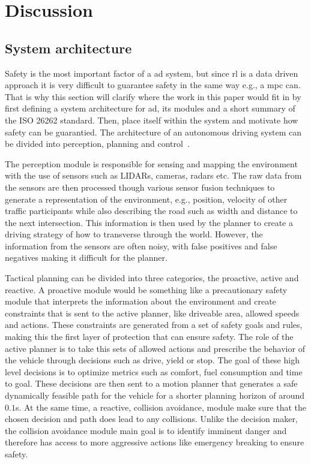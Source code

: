 \chapter{Discussion}
\label{sec:discussion}


\section{System architecture}
\label{sec:system_architecture}
Safety is the most important factor of a \gls{ad} system, but since \gls{rl} is a data driven approach it is very difficult to guarantee safety \cite{tbd} in the same way e.g., a \gls{mpc} can. That is why this section will clarify where the work in this paper would fit in by first defining a system architecture for \gls{ad}, its modules and a short summary of the ISO 26262 standard. Then, place itself within the system and motivate how safety can be guarantied. 
The architecture of an autonomous driving system can be divided into perception, planning and control~\cite{Schwarting2018,Kortenkamp2008}.

The perception module is responsible for sensing and mapping the environment with the use of sensors such as LIDARs, cameras, radars etc. The raw data from the sensors are then processed though various sensor fusion techniques to generate a representation of the environment, e.g., position, velocity of other traffic participants while also describing the road such as width and distance to the next intersection. This information is then used by the planner to create a driving strategy of how to transverse through the world. However, the information from the sensors are often noisy, with false positives and false negatives making it difficult for the planner.

Tactical planning can be divided into three categories, the proactive, active and reactive. A proactive module would be something like a precautionary safety module that interprets the information about the environment and create constraints that is sent to the active planner, like  driveable area, allowed speeds and actions. These constraints are generated from a set of safety goals and rules, making this the first layer of protection that can ensure safety. 
The role of the active planner is to take this sets of allowed actions and prescribe the behavior of the vehicle through decisions such as drive, yield or stop. The goal of these high level decisions is to optimize metrics such as comfort, fuel consumption and time to goal. These decisions are then sent to a motion planner that generates a safe dynamically feasible path for the vehicle for a shorter planning horizon of around $0.1$s. 
At the same time, a reactive, collision avoidance, module make sure that the chosen decision and path does lead to any collisions. Unlike the decision maker, the collision avoidance module main goal is to identify imminent danger and therefore has access to more aggressive actions like emergency breaking to ensure safety. 
 
